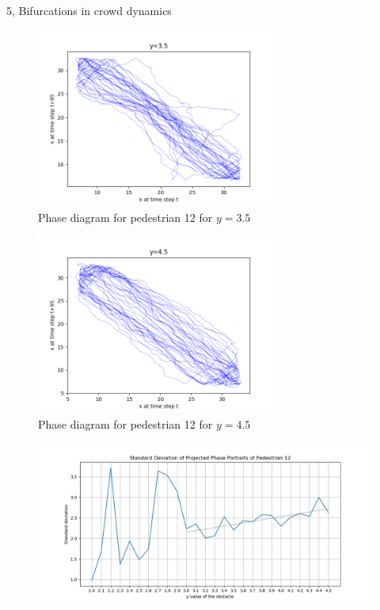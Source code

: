 \documentclass[10pt,a4paper]{article}
\begin{document}
\begin{task}{5, Bifurcations in crowd dynamics}
\begin{figure}[H]
\end{figure}
\begin{figure}[H]
\centering
\includegraphics[width=0.7\textwidth]{../plots/task5/12_phase_portrait_y_3,5.png}
\caption{Phase diagram for pedestrian 12 for $y=3.5$}
\label{task5_phase3.5}
\end{figure}
\begin{figure}[H]
\centering
\includegraphics[width=0.7\textwidth]{../plots/task5/12_phase_portrait_y_4,5.png}
\caption{Phase diagram for pedestrian 12 for $y=4.5$}
\label{task5_phase4.5}
\end{figure}
\begin{figure}[H]
\centering
\includegraphics[width=\textwidth]{../plots/task5/std_projection_phase_ped12.png}

\end{figure}
\end{task}
\end{document}
